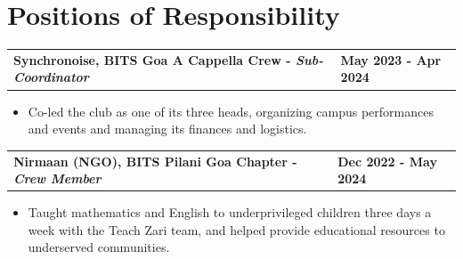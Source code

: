 \documentclass[letterpaper,11pt]{article}
\begin{document}
\section{Positions of Responsibility}
\begin{tabularx}{\linewidth}{ @{}l X@{} }

\textbf{Synchronoise, BITS Goa A Cappella Crew - \textit{Sub-Coordinator}} & \hfill \textbf{May 2023 - Apr 2024 }\\
\end{tabularx}

\begin{itemize}
    \vspace{-0.5em}
    \item[--] Co-led the club as one of its three heads, organizing campus performances and events and managing its finances and logistics. 
\end{itemize}

\begin{tabularx}{\linewidth}{ @{}l X@{} }
\textbf{Nirmaan (NGO), BITS Pilani Goa Chapter - \textit{Crew Member}} & \hfill \textbf{Dec 2022 - May 2024} \\

\end{tabularx}

\begin{itemize}
    \vspace{-0.5em}
    \item[--] Taught mathematics and English to underprivileged children three days a week with the Teach Zari team, and helped provide educational resources to underserved communities. \vspace{-0.5em}
\end{itemize}
\vspace{-0.8em}







\end{document}

